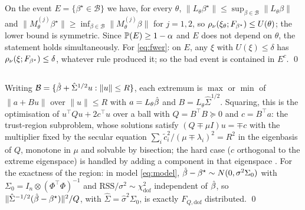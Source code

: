 \subsection*{}
On the event $E = \{\beta^\star \in \mathcal B\}$ we have, for every $\theta$,
$\|L_\theta\beta^\star\| \le \sup_{\beta \in \mathcal B}\|L_\theta\beta\|$ and
$\|M^{(j)}_\theta\beta^\star\| \ge \inf_{\beta\in\mathcal B}
\|M^{(j)}_\theta\beta\|$ for $j = 1,2$, so
$\rho_\nu(\xi_\theta;F_{\beta^\star}) \le U(\theta)$; the lower bound is
symmetric. Since $\mathbb{P}(E) \ge 1-\alpha$ and $E$ does not depend on $\theta$,
the statement holds simultaneously. For \eqref{eq:fwer}: on $E$, any $\xi$ with
$U(\xi) \le \delta$ has $\rho_\nu(\xi;F_{\beta^\star}) \le \delta$,
whatever rule produced it; so the bad event is contained in $E^c$. \qed

\subsection*{}
Writing $\mathcal B = \{\hat{\beta} + \hat\Sigma^{1/2}u : \|u\|\le R\}$, each
extremum is $\max$ or $\min$ of $\|a + Bu\|$ over $\|u\| \le R$ with
$a = L_\theta\hat{\beta}$ and $B = L_\theta\hat\Sigma^{1/2}$. Squaring, this is the
optimisation of $u^{\!\top}Qu + 2c^{\!\top}u$ over a ball with $Q = B^{\!\top}B
\succeq 0$ and $c = B^{\!\top}a$: the trust-region subproblem, whose solutions
satisfy $(Q \mp \mu I)u = \mp c$ with the multiplier fixed by the secular
equation $\sum_i \tilde c_i^2/(\mu \mp \lambda_i)^2 = R^2$ in the eigenbasis of
$Q$, monotone in $\mu$ and solvable by bisection; the hard case ($c$ orthogonal
to the extreme eigenspace) is handled by adding a component in that eigenspace
\citep{gander1989constrained,more1983computing,conn2000trust}. For the exactness
of the region: in model \eqref{eq:model}, $\hat{\beta} - \beta^\star \sim
N(0, \sigma^2 \Sigma_0)$ with $\Sigma_0 = I_n \otimes (\Phi^{\!\top}\Phi)^{-1}$
and $\mathrm{RSS}/\sigma^2 \sim \chi^2_{\mathrm{dof}}$ independent of $\hat{\beta}$,
so $\|\hat\Sigma^{-1/2}(\hat{\beta}-\beta^\star)\|^2/Q$, with
$\hat\Sigma = \hat\sigma^2\Sigma_0$, is exactly $F_{Q,\mathrm{dof}}$
distributed. \qed


